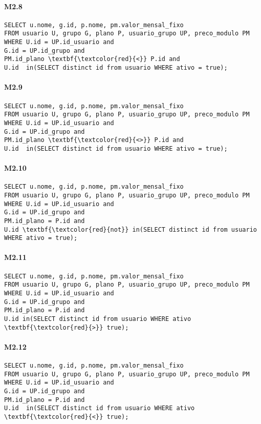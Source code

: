 \paragraph{M2.8}
\begin{Verbatim}
SELECT u.nome, g.id, p.nome, pm.valor_mensal_fixo
FROM usuario U, grupo G, plano P, usuario_grupo UP, preco_modulo PM
WHERE U.id = UP.id_usuario and
G.id = UP.id_grupo and
PM.id_plano \textbf{\textcolor{red}{<}} P.id and
U.id  in(SELECT distinct id from usuario WHERE ativo = true);
\end{Verbatim}



\paragraph{M2.9}
\begin{Verbatim}
SELECT u.nome, g.id, p.nome, pm.valor_mensal_fixo
FROM usuario U, grupo G, plano P, usuario_grupo UP, preco_modulo PM
WHERE U.id = UP.id_usuario and
G.id = UP.id_grupo and
PM.id_plano \textbf{\textcolor{red}{<>}} P.id and
U.id  in(SELECT distinct id from usuario WHERE ativo = true);
\end{Verbatim}

\paragraph{M2.10}
\begin{Verbatim}
SELECT u.nome, g.id, p.nome, pm.valor_mensal_fixo
FROM usuario U, grupo G, plano P, usuario_grupo UP, preco_modulo PM
WHERE U.id = UP.id_usuario and
G.id = UP.id_grupo and
PM.id_plano = P.id and
U.id \textbf{\textcolor{red}{not}} in(SELECT distinct id from usuario WHERE ativo = true);
\end{Verbatim}

\paragraph{M2.11}
\begin{Verbatim}
SELECT u.nome, g.id, p.nome, pm.valor_mensal_fixo
FROM usuario U, grupo G, plano P, usuario_grupo UP, preco_modulo PM
WHERE U.id = UP.id_usuario and
G.id = UP.id_grupo and
PM.id_plano = P.id and
U.id in(SELECT distinct id from usuario WHERE ativo \textbf{\textcolor{red}{>}} true);
\end{Verbatim}

\paragraph{M2.12}
\begin{Verbatim}
SELECT u.nome, g.id, p.nome, pm.valor_mensal_fixo
FROM usuario U, grupo G, plano P, usuario_grupo UP, preco_modulo PM
WHERE U.id = UP.id_usuario and
G.id = UP.id_grupo and
PM.id_plano = P.id and
U.id  in(SELECT distinct id from usuario WHERE ativo \textbf{\textcolor{red}{<}} true);
\end{Verbatim}

